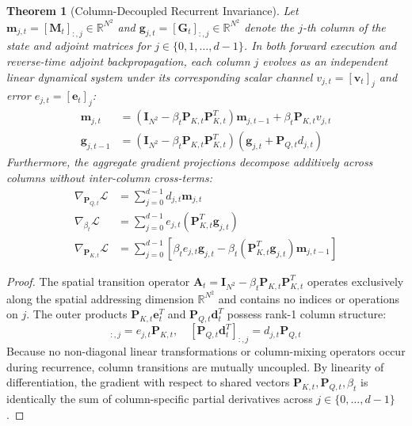 \documentclass[11pt,a4paper]{article}
\newtheorem{theorem}{Theorem}[section]
\begin{document}
\begin{theorem}[Column-Decoupled Recurrent Invariance]
\label{thm:column_decoupling}
Let $\mathbf{m}_{j, t} = [\mathbf{M}_t]_{:, j} \in \mathbb{R}^{N^2}$ and $\mathbf{g}_{j, t} = [\mathbf{G}_t]_{:, j} \in \mathbb{R}^{N^2}$ denote the $j$-th column of the state and adjoint matrices for $j \in \{0, 1, \dots, d-1\}$. In both forward execution and reverse-time adjoint backpropagation, each column $j$ evolves as an independent linear dynamical system under its corresponding scalar channel $v_{j, t} = [\mathbf{v}_t]_j$ and error $e_{j, t} = [\mathbf{e}_t]_j$:
\begin{align}
    \mathbf{m}_{j, t} &= (\mathbf{I}_{N^2} - \beta_t \mathbf{P}_{K,t} \mathbf{P}_{K,t}^T) \mathbf{m}_{j, t-1} + \beta_t \mathbf{P}_{K,t} v_{j,t} \\
    \mathbf{g}_{j, t-1} &= (\mathbf{I}_{N^2} - \beta_t \mathbf{P}_{K,t} \mathbf{P}_{K,t}^T) (\mathbf{g}_{j, t} + \mathbf{P}_{Q,t} d_{j,t})
\end{align}
Furthermore, the aggregate gradient projections decompose additively across columns without inter-column cross-terms:
\begin{align}
    \nabla_{\mathbf{P}_{Q,t}} \mathcal{L} &= \sum_{j=0}^{d-1} d_{j,t} \mathbf{m}_{j,t} \\
    \nabla_{\beta_t} \mathcal{L} &= \sum_{j=0}^{d-1} e_{j,t} (\mathbf{P}_{K,t}^T \mathbf{g}_{j,t}) \\
    \nabla_{\mathbf{P}_{K,t}} \mathcal{L} &= \sum_{j=0}^{d-1} \left[ \beta_t e_{j,t} \mathbf{g}_{j,t} - \beta_t (\mathbf{P}_{K,t}^T \mathbf{g}_{j,t}) \mathbf{m}_{j,t-1} \right]
\end{align}
\end{theorem}

\begin{proof}
The spatial transition operator $\mathbf{A}_t = \mathbf{I}_{N^2} - \beta_t \mathbf{P}_{K,t} \mathbf{P}_{K,t}^T$ operates exclusively along the spatial addressing dimension $\mathbb{R}^{N^2}$ and contains no indices or operations on $j$. The outer products $\mathbf{P}_{K,t} \mathbf{e}_t^T$ and $\mathbf{P}_{Q,t} \mathbf{d}_t^T$ possess rank-1 column structure:
\begin{equation}
    [\mathbf{P}_{K,t} \mathbf{e}_t^T]_{:, j} = e_{j,t} \mathbf{P}_{K,t}, \quad [\mathbf{P}_{Q,t} \mathbf{d}_t^T]_{:, j} = d_{j,t} \mathbf{P}_{Q,t}
\end{equation}
Because no non-diagonal linear transformations or column-mixing operators occur during recurrence, column transitions are mutually uncoupled. By linearity of differentiation, the gradient with respect to shared vectors $\mathbf{P}_{K,t}, \mathbf{P}_{Q,t}, \beta_t$ is identically the sum of column-specific partial derivatives across $j \in \{0, \dots, d-1\}$.
\end{proof}
\end{document}

